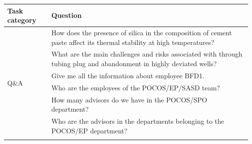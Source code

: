             
            \begin{table}[h]
                \centering
                \scriptsize
                \sloppy
                \begin{tabular}{|p{.1\linewidth}|p{.9\linewidth}|}
                \hline
                \textbf{Task category} & \textbf{Question} \\   \hline
                \multirow{17}{*}{Q\&A} & How does the presence of silica in the composition of cement 
                paste affect its thermal stability at high temperatures? \\ \cline{2-2}
                & What are the main challenges and risks associated with through tubing plug and abandonment in highly deviated wells? \\ \cline{2-2}
                & Give me all the information about employee BFD1. \\ \cline{2-2}
                & Who are the employees of the POCOS/EP/SASD team? \\ \cline{2-2}
                & How many advisors do we have in the POCOS/SPO department? \\ \cline{2-2}
                & Who are the advisors in the departments belonging to the POCOS/EP department? \\ \cline{2-2}

\end{tabular}
\end{table}
